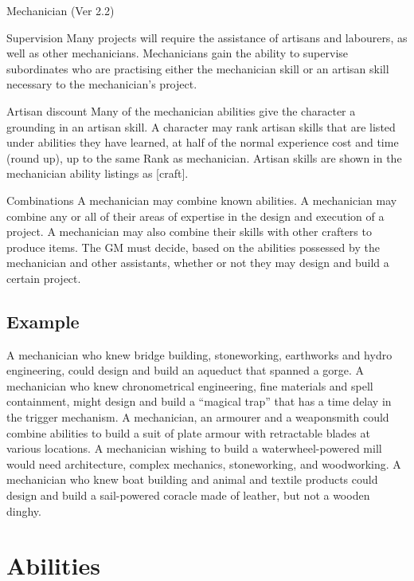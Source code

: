\begin{Chapter}{Mechanician (Ver 2.2)}
\begin{Description}
\item[Supervision] Many projects will require the assistance of
  artisans and labourers, as well as other mechanicians.  Mechanicians
  gain the ability to supervise subordinates who are practising either
  the mechanician skill or an artisan skill necessary to the
  mechanician’s project.

\item[Artisan] discount Many of the mechanician abilities give the
  character a grounding in an artisan skill.  A character may rank
  artisan skills that are listed under abilities they have learned, at
  half of the normal experience cost and time (round up), up to the
  same Rank as mechanician. Artisan skills are shown in the
  mechanician ability listings as [craft].

\item[Combinations] A mechanician may combine known abilities.  A
  mechanician may combine any or all of their areas of expertise in
  the design and execution of a project.  A mechanician may also
  combine their skills with other crafters to produce items. The GM
  must decide, based on the abilities possessed by the mechanician and
  other assistants, whether or not they may design and build a certain
  project.

\end{Description}


\subsection{Example}

A mechanician who knew bridge building, stoneworking, earthworks and
hydro engineering, could design and build an aqueduct that spanned a
gorge.  A mechanician who knew chronometrical engineering, fine
materials and spell containment, might design and build a “magical
trap” that has a time delay in the trigger mechanism.  A mechanician,
an armourer and a weaponsmith could combine abilities to build a suit
of plate armour with retractable blades at various locations.  A
mechanician wishing to build a waterwheel-powered mill would need
architecture, complex mechanics, stoneworking, and woodworking.  A
mechanician who knew boat building and animal and textile products
could design and build a sail-powered coracle made of leather, but not
a wooden dinghy.

\section{Abilities}


\end{Chapter}

